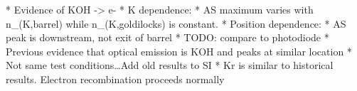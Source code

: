 

\begin{markdown}
* Evidence of KOH -> e-
    * K dependence: 
    * AS maximum varies with n_(K,barrel) while n_(K,goldilocks)  is constant. 
* Position dependence: 
    * AS peak is downstream, not exit of barrel
    * TODO: compare to photodiode
    * Previous evidence that optical emission is KOH and peaks at similar location
    * Not same test conditions…Add old results to SI
* Kr is similar to historical results. Electron recombination proceeds normally
\end{markdown}